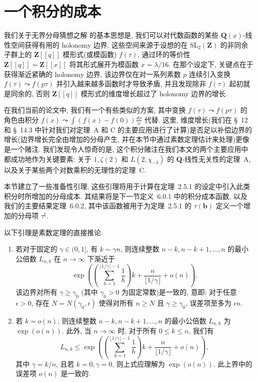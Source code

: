 \section{一个积分的成本}\label{sec:5}

我们关于无界分母猜想之解 \cite{CDT21} 的基本思想是, 我们可以对代数函数的某些 $\mathbf{Q}(x)$-线性空间获得有用的 holonomy 边界, 这些空间来源于设想的在 $\mathrm{SL}_2(\mathbf{Z})$ 的非同余子群上的 $\mathbf{Z}[\![q]\!]$ 模形式(或模函数) $f(\tau)$, 通过环的等价性 $\mathbf{Z}[\![q]\!] = \mathbf{Z}[\![x]\!]$ 将其形式展开为模函数 $x = \lambda/16$.
在那个设定下, 关键点在于获得渐近紧确的 holonomy 边界, 该边界仅在对一系列素数 $p$ 连续引入变换 $f(\tau) \leadsto f(p\tau)$ 并引入越来越多函数时才导致矛盾, 并且发现除非 $f(\tau)$ 起初就是同余的, 否则 $\mathbf{Z}[\![q]\!]$ 模形式的维度增长超过了 holonomy 边界的增长.

在我们当前的论文中, 我们有一个有些类似的方案, 其中变换 $f(\tau) \leadsto f(p\tau)$ 的角色由积分 $f(x) \leadsto \int (f(x) - f(0)) \frac{dx}{x}$ 代替.
这里, 维度增长(我们在 \S~12 和 \S~14.3 中针对我们对定理~A 和 C 的主要应用进行了计算)是否足以补偿边界的增长(边界增长完全由增加的分母产生, 并在本节中通过素数定理估计来处理)更像是一个赌注.
我们发现令人惊奇的是, 这个积分赌注在我们本文的两个主要应用中都成功地作为关键要素: 关于 $1, \zeta(2)$ 和 $L(2, \chi_{-3})$ 的 $\mathbf{Q}$-线性无关性的定理~A, 以及关于某些两个对数乘积的无理性的定理~C.

本节建立了一些准备性引理, 这些引理将用于计算在定理~2.5.1 的设定中引入此类积分时所增加的分母成本.
其结果将是下一节定义~6.0.1 中的积分成本函数, 以及我们的主要结果定理~6.0.2, 其中该函数被用于为定理~2.5.1 的 $\tau(\mathbf{b})$ 定义一个增加的分母项 $\tau^{\sharp}$.

以下引理是素数定理的直接推论.

\begin{lemma}\label{lem:5.0.1}
\quad
\begin{enumerate}
  \item[(1)] 若对于固定的 $\gamma \in (0,1]$, 有 $k \sim \gamma n$, 则连续整数 $n-k, n-k+1, \ldots, n$ 的最小公倍数 $L_{n,k}$ 在 $n \to \infty$ 下渐近于
  \[ \exp\left(\left(\sum_{h=1}^{\lfloor 1/\gamma\rfloor-1}\frac{1}{h}\right)k+\frac{n}{\lfloor 1/\gamma\rfloor}+o(n)\right). \]
  该边界对所有 $\gamma \geq \gamma_0$ (其中 $\gamma_0 > 0$ 为固定常数)是一致的, 意即: 对于任意 $\epsilon > 0$, 存在 $N = N(\gamma_0, \epsilon)$ 使得对所有 $n \geq N$ 且 $\gamma \geq \gamma_0$, 误差项至多为 $\epsilon n$.
  
  \item[(2)] 若 $k = o(n)$, 则连续整数 $n - k, n - k + 1, \ldots, n$ 的最小公倍数 $L_{n,k}$ 为 $\exp(o(n))$.
  此外, 当 $n \to \infty$ 时, 对于所有 $0 \le k \le n$, 我们有
  \[ L_{n,k} \le \exp\left(\left(\sum_{h=1}^{\lfloor 1/\gamma \rfloor - 1} \frac{1}{h}\right) k + \frac{n}{\lfloor 1/\gamma \rfloor} + o(n)\right), \]
  其中 $\gamma = k/n$, 且若 $k = 0, \gamma = 0$, 则上式应理解为 $\exp(o(n))$.
  此上界中的误差项 $o(n)$ 是一致的.
\end{enumerate}
\end{lemma}

